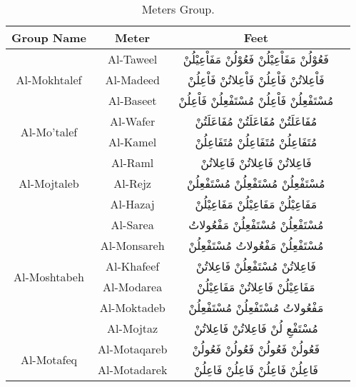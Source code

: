 \begin{itemize}
\begin{table}[t]
  \centering
  \begin{tabular}{c c c c}
    \toprule
    \textbf{Group Name} & \textbf{Meter}  & \textbf{Feet} \\
    \toprule
     \multirow{3}{*}{Al-Mokhtalef} & Al-Taweel & \textarabic{فَعُوْلُنْ مَفَاْعِيْلُنْ فَعُوْلُنْ مَفَاْعِيْلُنْ}\\
       & Al-Madeed&  \textarabic{فَاْعِلاتُنْ فَاْعِلُنْ فَاْعِلاتُنْ فَاْعِلُنْ}\\
       & Al-Baseet  & \textarabic{مُسْتَفْعِلُنْ فَاْعِلُنْ مُسْتَفْعِلُنْ فَاْعِلُنْ}\\
    \midrule
     \multirow{2}{*}{Al-Mo'talef} & Al-Wafer & \textarabic{مُفَاعَلَتُنْ مُفَاعَلَتُنْ مُفَاعَلَتُنْ}\\
       & Al-Kamel&  \textarabic{مُتَفَاعِلُنْ مُتَفَاعِلُنْ مُتَفَاعِلُنْ}\\
    \midrule
      \multirow{3}{*}{Al-Mojtaleb} & Al-Raml & \textarabic{فَاعِلاتُنْ فَاعِلاتُنْ فَاعِلاتُنْ}\\
       & Al-Rejz&  \textarabic{مُسْتَفْعِلُنْ مُسْتَفْعِلُنْ مُسْتَفْعِلُنْ}\\
       & Al-Hazaj  & \textarabic{مَفَاعِيْلُنْ مَفَاعِيْلُنْ مَفَاعِيْلُنْ}\\
    \midrule
      \multirow{6}{*}{Al-Moshtabeh} & Al-Sarea & \textarabic{مُسْتَفْعِلُنْ مُسْتَفْعِلُنْ مَفْعُولاتُ}\\
       & Al-Monsareh&  \textarabic{مُسْتَفْعِلُنْ مَفْعُولاتُ مُسْتَفْعِلُنْ}\\
       & Al-Khafeef  & \textarabic{فَاعِلاتُنْ مُسْتَفْعِلُنْ فَاعِلاتُنْ}\\
       & Al-Modarea  & \textarabic{مَفَاعِيْلُنْ فَاعِلاتُنْ مَفَاعِيْلُنْ}\\
       & Al-Moktadeb  & \textarabic{مَفْعُولاتُ مُسْتَفْعِلُنْ مُسْتَفْعِلُنْ}\\
       & Al-Mojtaz  & \textarabic{مُسْتَفْعِ لُنْ فَاعِلاتُنْ فَاعِلاتُنْ}\\
    \midrule
      \multirow{2}{*}{Al-Motafeq} & Al-Motaqareb & \textarabic{فَعُولُنْ فَعُولُنْ فَعُولُنْ فَعُولُنْ}\\
       & Al-Motadarek&  \textarabic{فَاعِلُنْ فَاعِلُنْ فَاعِلُنْ فَاعِلُنْ}\\
    \bottomrule                                           
  \end{tabular}
\caption{Meters Group.}\label{Tab:Meters_Group}
\end{table}%
\end{itemize}
